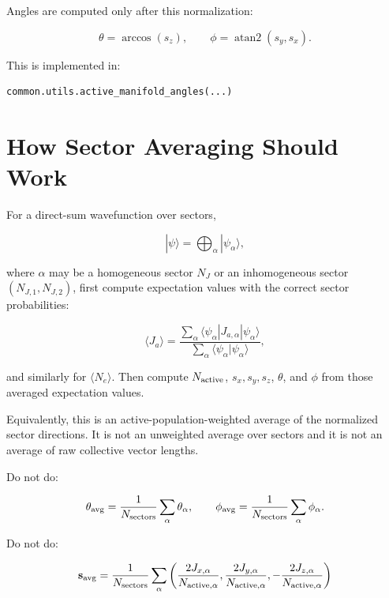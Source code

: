 \documentclass[11pt]{article}
\begin{document}
Angles are computed only after this normalization:

\begin{equation}
\theta=\arccos(s_z),
\qquad
\phi=\operatorname{atan2}(s_y,s_x).
\end{equation}

This is implemented in:

\begin{verbatim}
common.utils.active_manifold_angles(...)
\end{verbatim}

\section*{How Sector Averaging Should Work}

For a direct-sum wavefunction over sectors,

\begin{equation}
|\psi\rangle=\bigoplus_\alpha |\psi_\alpha\rangle,
\end{equation}

where \(\alpha\) may be a homogeneous sector \(N_J\) or an inhomogeneous sector
\((N_{J,1},N_{J,2})\), first compute expectation values with the correct sector
probabilities:

\begin{equation}
\langle J_a\rangle
=
\frac{\sum_\alpha
\langle\psi_\alpha|J_{a,\alpha}|\psi_\alpha\rangle}
{\sum_\alpha \langle\psi_\alpha|\psi_\alpha\rangle},
\end{equation}

and similarly for \(\langle N_e\rangle\). Then compute \(N_{\rm active}\),
\(s_x,s_y,s_z\), \(\theta\), and \(\phi\) from those averaged expectation
values.

Equivalently, this is an active-population-weighted average of the normalized
sector directions. It is not an unweighted average over sectors and it is not an
average of raw collective vector lengths.

Do not do:

\begin{equation}
\theta_{\rm avg}
=
\frac{1}{N_{\rm sectors}}\sum_\alpha \theta_\alpha,
\qquad
\phi_{\rm avg}
=
\frac{1}{N_{\rm sectors}}\sum_\alpha \phi_\alpha.
\end{equation}

Do not do:

\begin{equation}
\mathbf{s}_{\rm avg}
=
\frac{1}{N_{\rm sectors}}\sum_\alpha
\left(
\frac{2J_{x,\alpha}}{N_{{\rm active},\alpha}},
\frac{2J_{y,\alpha}}{N_{{\rm active},\alpha}},
-\frac{2J_{z,\alpha}}{N_{{\rm active},\alpha}}
\right)
\end{equation}
\end{document}
